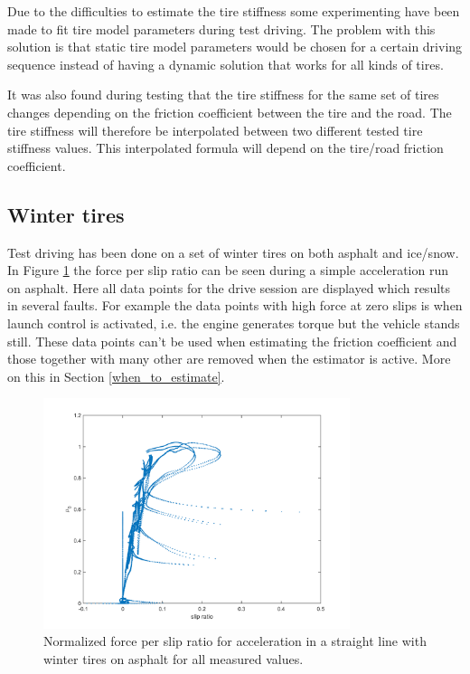 Due to the difficulties to estimate the tire stiffness some experimenting have been made to fit tire model parameters during test driving. The problem with this solution is that static tire model parameters would be chosen for a certain driving sequence instead of having a dynamic solution that works for all kinds of tires. 

It was also found during testing that the tire stiffness for the same set of tires changes depending on the friction coefficient between the tire and the road. The tire stiffness will therefore be interpolated between two different tested tire stiffness values. This interpolated formula will depend on the tire/road friction coefficient. 

\subsection{Winter tires}
\label{winter_tire}
Test driving has been done on a set of winter tires on both asphalt and ice/snow. In Figure \ref{slip_kraft_olika_acc_uncensored} the force per slip ratio can be seen during a simple acceleration run on asphalt. Here all data points for the drive session are displayed which results in several faults. For example the data points with high force at zero slips is when launch control is activated, i.e. the engine generates torque but the vehicle stands still. These data points can't be used when estimating the friction coefficient and those together with many other are removed when the estimator is active. More on this in Section \ref{when_to_estimate}.   

\begin{figure}[h]
	\centering
	\includegraphics[width=0.8\textwidth]{Pictures/slip_kraft_olika_acc_uncensored}
	\caption {Normalized force per slip ratio for acceleration in a straight line with winter tires on asphalt for all measured values.}
	\label{slip_kraft_olika_acc_uncensored}
\end{figure}

